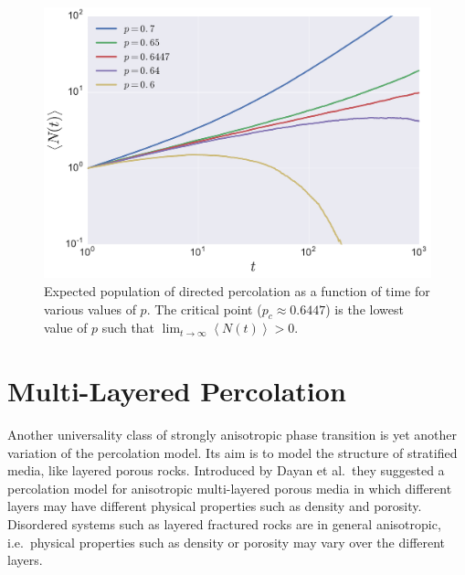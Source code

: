 \begin{figure}
\begin{center}
    \includegraphics[scale=0.5]{chapters/ch5-anis/figs/dperco_nt}
\end{center}
\caption{Expected population of directed percolation as a function of time for
    various values of $p$. The critical point ($p_c\approx0.6447$) is the
    lowest value of $p$ such that $\lim_{t\rightarrow\infty}\left\langle
        N(t)\right\rangle>0$.}
\label{fig:dperco_nt}
\end{figure}


\section{Multi-Layered Percolation}
\label{sec:mlp}

Another universality class of strongly anisotropic phase transition is yet
another variation of the percolation model. Its aim is to model the structure
of stratified media, like layered porous rocks. Introduced by Dayan et al.\,
they suggested a percolation model for anisotropic multi-layered porous media
in which different layers may have different physical properties such as
density and porosity. Disordered systems such as layered fractured rocks are in
general anisotropic, i.e.\ physical properties such as density or porosity may
vary over the different layers.

